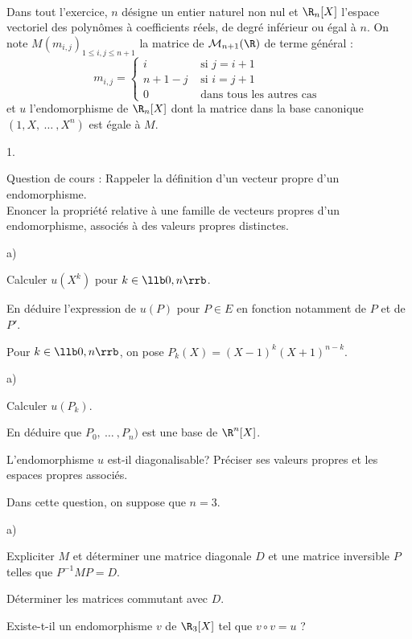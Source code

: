 \documentclass[11pt]{article}%
\begin{document}
\begin{exerciceAP}~\\
  Dans tout l'exercice, $n$ désigne un entier naturel non nul et
  $\R_n[X]$ l'espace vectoriel des polynômes à coefficients réels, de
  degré inférieur ou égal à $n$. On note $M (m_{i,j})_{1 \leq i,j \leq
    n+1}$ la matrice de $\mathcal{M}_{n+1} (\R)$ de terme général :
  \[
  m_{i,j} = \left\{ 
    \begin{array}{cc} 
      i & \text{ si } j = i+1 
      \\[.2cm] 
      n + 1 - j & \text{ si } i = j + 1 
      \\[.2cm]
      0 & \text{ dans tous les autres cas } 
    \end{array} 
  \right. 
  \]
  et $u$ l'endomorphisme de $\R_n[X]$ dont la matrice dans la base
  canonique $(1 , X ,\ \dots\ , X^n)$ est égale à $M$.
  \begin{noliste}{1.}
    \setlength{\itemsep}{2mm}
  \item Question de cours : Rappeler la définition d'un vecteur propre
    d'un endomorphisme. \\
    Enoncer la propriété relative à une famille de vecteurs propres
    d'un endomorphisme, associés à des valeurs propres distinctes.
  \item
    \begin{noliste}{a)}
    \setlength{\itemsep}{2mm} \item Calculer $u(X^k)$ pour $k \in \llb 0 , n
      \rrb$.
    \item En déduire l'expression de $u(P)$ pour $P \in E$ en fonction
      notamment de $P$ et de $P'$.
    \end{noliste}
  \item Pour $k \in \llb 0 , n \rrb$, on pose $P_k (X) = (X-1)^k
    (X+1)^{n-k}$.
    \begin{noliste}{a)}
    \setlength{\itemsep}{2mm} \item Calculer $u(P_k)$.
    \item En déduire que $P_0 ,\ \dots\ , P_n)$ est une base de
      $\R^n[X]$.
    \item L'endomorphisme $u$ est-il diagonalisable? Préciser ses
      valeurs propres et les espaces propres associés.
    \end{noliste}
  \item Dans cette question, on suppose que $n = 3$.
    \begin{noliste}{a)}
    \setlength{\itemsep}{2mm} 
    \item Expliciter $M$ et déterminer une matrice diagonale $D$ et
      une matrice inversible $P$ telles que $P^{-1} M P = D$.
    \item Déterminer les matrices commutant avec $D$.
    \item Existe-t-il un endomorphisme $v$ de $\R_3[X]$ tel que $v
      \circ v = u$ ?
    \end{noliste}
  \end{noliste}
\end{exerciceAP}
\end{document}
